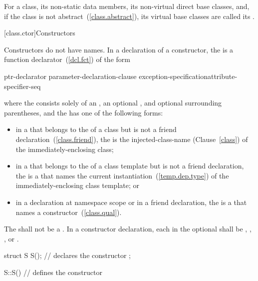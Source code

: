 \pnum
For a class, its non-static data members, its non-virtual direct base classes,
and, if the class is not abstract~(\ref{class.abstract}), its virtual base
classes are called its .

[class.ctor]{Constructors}%

\pnum
Constructors do not have names.
In a declaration of a constructor, the  is a
function declarator~(\ref{dcl.fct}) of the form

\begin{ncbnf}
ptr-declarator \terminal{(} parameter-declaration-clause \terminal{)} exception-specification\opt attribute-specifier-seq\opt
\end{ncbnf}

where the  consists solely of an
, an optional ,
and optional surrounding parentheses, and the  has
one of the following forms:

\begin{itemize}
\item
in a  that belongs to the
 of a class but is not a friend
declaration~(\ref{class.friend}), the  is the
injected-class-name (Clause~\ref{class}) of the immediately-enclosing class;

\item
in a  that belongs to the
 of a class template but is not a friend
declaration, the  is a  that
names the current instantiation~(\ref{temp.dep.type}) of the
immediately-enclosing class template; or

\item
in a declaration at namespace scope or in a friend declaration, the
 is a  that names a
constructor~(\ref{class.qual}).
\end{itemize}

The  shall not be a . In a constructor
declaration, each  in the optional
 shall be , ,
, or .
\enterexample

\begin{codeblock}
struct S {
  S();              // declares the constructor
};

S::S() { }          // defines the constructor
\end{codeblock}
\exitexample

